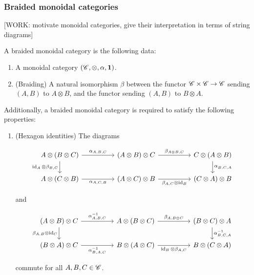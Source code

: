\subsubsection{Braided monoidal categories}

[WORK: motivate monoidal categories, give their interpretation in terms of string diagrams]


\begin{definition} A braided monoidal category is the following data:

\begin{enumerate}
\item A monoidal category $(\mathscr{C},\otimes,\alpha, \mathbf{1})$.
\item (Braiding) A natural isomorphism $\beta$ between the functor $\mathscr{C}\times \mathscr{C}\to \mathscr{C}$ sending $(A,B)$ to $A\otimes B$, and the functor sending $(A,B)$ to $B\otimes A$.
\end{enumerate}

Additionally, a braided monoidal category is required to satisfy the following properties:

\begin{enumerate}
\item (Hexagon identities) The diagrams

\[\begin{tikzcd}
	{A\otimes (B\otimes C)} && {(A\otimes B)\otimes C} && {C\otimes (A\otimes B)} \\
	{A\otimes (C\otimes B)} && {(A\otimes C)\otimes B} && {(C\otimes A)\otimes B}
	\arrow["{\alpha_{A,B,C}}", from=1-1, to=1-3]
	\arrow["{\beta_{A\otimes B,C}}", from=1-3, to=1-5]
	\arrow["{\alpha^{}_{B,C,A}}", from=1-5, to=2-5]
	\arrow["{\id_A\otimes \beta_{B,C}}"', from=1-1, to=2-1]
	\arrow["{\alpha_{A,C,B}}"', from=2-1, to=2-3]
	\arrow["{\beta_{A,C}\otimes \id_B}"', from=2-3, to=2-5]
\end{tikzcd}\]

and

\[\begin{tikzcd}
	{(A\otimes B)\otimes C} && {A\otimes (B\otimes C)} && {(B\otimes C)\otimes A} \\
	{(B\otimes A)\otimes C} && {B\otimes (A\otimes C)} && {B\otimes (C\otimes A)}
	\arrow["{\alpha^{-1}_{A,B,C}}", from=1-1, to=1-3]
	\arrow["{\beta_{A,B\otimes C}}", from=1-3, to=1-5]
	\arrow["{\alpha^{-1}_{B,C,A}}", from=1-5, to=2-5]
	\arrow["{\beta_{A,B}\otimes \id_C}"', from=1-1, to=2-1]
	\arrow["{\alpha^{-1}_{B,A,C}}"', from=2-1, to=2-3]
	\arrow["{\id_B\otimes \beta_{A,C}}"', from=2-3, to=2-5]
\end{tikzcd}\]

commute for all $A,B,C\in \mathscr{C}$.
\end{enumerate}

\raggedleft\qedsymbol{}
\end{definition}

